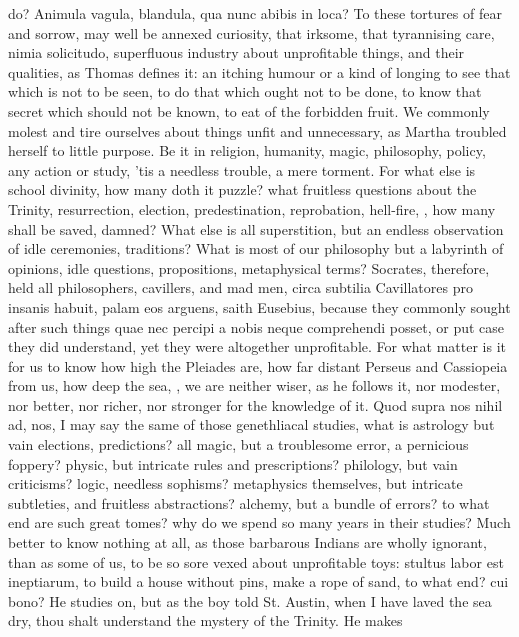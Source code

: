 {do? Animula vagula, blandula, qua nunc abibis in loca?
To these tortures of fear and sorrow, may well be annexed curiosity,
that irksome, that tyrannising care, nimia solicitudo,
superfluous industry about unprofitable things, and their
qualities, as Thomas defines it: an itching humour or a kind of longing
to see that which is not to be seen, to do that which ought not to be
done, to know that secret which should not be known, to eat of
the forbidden fruit. We commonly molest and tire ourselves about things
unfit and unnecessary, as Martha troubled herself to little purpose. Be
it in religion, humanity, magic, philosophy, policy, any action or
study, 'tis a needless trouble, a mere torment. For what else is school
divinity, how many doth it puzzle? what fruitless questions about the
Trinity, resurrection, election, predestination, reprobation,
hell-fire, \etc{}, how many shall be saved, damned? What else is all
superstition, but an endless observation of idle ceremonies,
traditions? What is most of our philosophy but a labyrinth of opinions,
idle questions, propositions, metaphysical terms? Socrates, therefore,
held all philosophers, cavillers, and mad men, circa subtilia
Cavillatores pro insanis habuit, palam eos arguens, saith
Eusebius, because they commonly sought after such things quae nec
percipi a nobis neque comprehendi posset, or put case they did
understand, yet they were altogether unprofitable. For what matter is
it for us to know how high the Pleiades are, how far distant Perseus
and Cassiopeia from us, how deep the sea, \etc{}, we are neither wiser, as
he follows it, nor modester, nor better, nor richer, nor stronger for
the knowledge of it. Quod supra nos nihil ad, nos, I may say the same
of those genethliacal studies, what is astrology but vain elections,
predictions? all magic, but a troublesome error, a pernicious foppery?
physic, but intricate rules and prescriptions? philology, but vain
criticisms? logic, needless sophisms? metaphysics themselves, but
intricate subtleties, and fruitless abstractions? alchemy, but a bundle
of errors? to what end are such great tomes? why do we spend so many
years in their studies? Much better to know nothing at all, as those
barbarous Indians are wholly ignorant, than as some of us, to be so
sore vexed about unprofitable toys: stultus labor est ineptiarum, to
build a house without pins, make a rope of sand, to what end? cui bono?
He studies on, but as the boy told St. Austin, when I have laved the
sea dry, thou shalt understand the mystery of the Trinity. He makes
}
